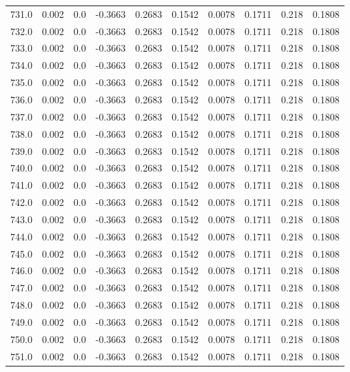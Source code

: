 \begin{longtable}{lrrrrrrrrr}
731.0 & 0.002 & 0.0 & -0.3663 & 0.2683 & 0.1542 & 0.0078 & 0.1711 & 0.218 & 0.1808 \\
732.0 & 0.002 & 0.0 & -0.3663 & 0.2683 & 0.1542 & 0.0078 & 0.1711 & 0.218 & 0.1808 \\
733.0 & 0.002 & 0.0 & -0.3663 & 0.2683 & 0.1542 & 0.0078 & 0.1711 & 0.218 & 0.1808 \\
734.0 & 0.002 & 0.0 & -0.3663 & 0.2683 & 0.1542 & 0.0078 & 0.1711 & 0.218 & 0.1808 \\
735.0 & 0.002 & 0.0 & -0.3663 & 0.2683 & 0.1542 & 0.0078 & 0.1711 & 0.218 & 0.1808 \\
736.0 & 0.002 & 0.0 & -0.3663 & 0.2683 & 0.1542 & 0.0078 & 0.1711 & 0.218 & 0.1808 \\
737.0 & 0.002 & 0.0 & -0.3663 & 0.2683 & 0.1542 & 0.0078 & 0.1711 & 0.218 & 0.1808 \\
738.0 & 0.002 & 0.0 & -0.3663 & 0.2683 & 0.1542 & 0.0078 & 0.1711 & 0.218 & 0.1808 \\
739.0 & 0.002 & 0.0 & -0.3663 & 0.2683 & 0.1542 & 0.0078 & 0.1711 & 0.218 & 0.1808 \\
740.0 & 0.002 & 0.0 & -0.3663 & 0.2683 & 0.1542 & 0.0078 & 0.1711 & 0.218 & 0.1808 \\
741.0 & 0.002 & 0.0 & -0.3663 & 0.2683 & 0.1542 & 0.0078 & 0.1711 & 0.218 & 0.1808 \\
742.0 & 0.002 & 0.0 & -0.3663 & 0.2683 & 0.1542 & 0.0078 & 0.1711 & 0.218 & 0.1808 \\
743.0 & 0.002 & 0.0 & -0.3663 & 0.2683 & 0.1542 & 0.0078 & 0.1711 & 0.218 & 0.1808 \\
744.0 & 0.002 & 0.0 & -0.3663 & 0.2683 & 0.1542 & 0.0078 & 0.1711 & 0.218 & 0.1808 \\
745.0 & 0.002 & 0.0 & -0.3663 & 0.2683 & 0.1542 & 0.0078 & 0.1711 & 0.218 & 0.1808 \\
746.0 & 0.002 & 0.0 & -0.3663 & 0.2683 & 0.1542 & 0.0078 & 0.1711 & 0.218 & 0.1808 \\
747.0 & 0.002 & 0.0 & -0.3663 & 0.2683 & 0.1542 & 0.0078 & 0.1711 & 0.218 & 0.1808 \\
748.0 & 0.002 & 0.0 & -0.3663 & 0.2683 & 0.1542 & 0.0078 & 0.1711 & 0.218 & 0.1808 \\
749.0 & 0.002 & 0.0 & -0.3663 & 0.2683 & 0.1542 & 0.0078 & 0.1711 & 0.218 & 0.1808 \\
750.0 & 0.002 & 0.0 & -0.3663 & 0.2683 & 0.1542 & 0.0078 & 0.1711 & 0.218 & 0.1808 \\
751.0 & 0.002 & 0.0 & -0.3663 & 0.2683 & 0.1542 & 0.0078 & 0.1711 & 0.218 & 0.1808 \\

\end{longtable}
